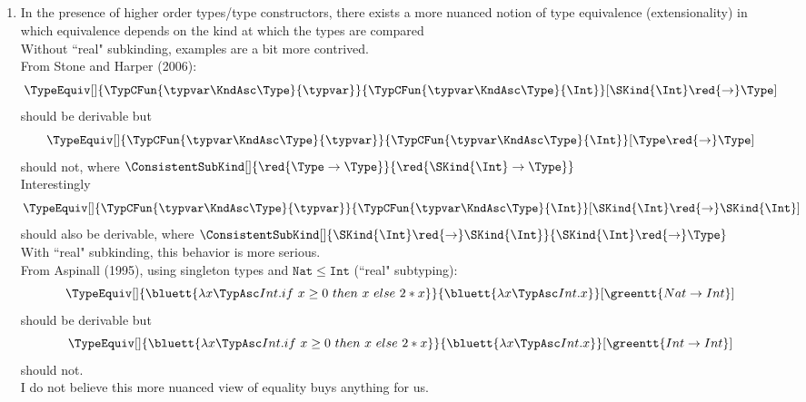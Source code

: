 \documentclass[12pt,fleqn]{article}
\begin{document}
    \subsection*{}
    \begin{enumerate}[label=Nibwm \arabic*:]
        \item In the presence of higher order types/type constructors, there exists a more nuanced notion of type equivalence (extensionality) in which equivalence depends on the kind at which the types are compared \\
            Without ``real" subkinding, examples are a bit more contrived. \\
            From Stone and Harper (2006): \\
            \[
                \TypeEquiv[]{\TypCFun{\typvar\KndAsc\Type}{\typvar}}{\TypCFun{\typvar\KndAsc\Type}{\Int}}[\SKind{\Int} \red{\rightarrow} \Type]
            \]
            should be derivable but
            \[
                \TypeEquiv[]{\TypCFun{\typvar\KndAsc\Type}{\typvar}}{\TypCFun{\typvar\KndAsc\Type}{\Int}}[\Type \red{\rightarrow} \Type]
            \]
            should not, where $\ConsistentSubKind[]{\red{\Type \rightarrow \Type}}{\red{\SKind{\Int} \rightarrow \Type}}$ \\
            Interestingly
            \[
                \TypeEquiv[]{\TypCFun{\typvar\KndAsc\Type}{\typvar}}{\TypCFun{\typvar\KndAsc\Type}{\Int}}[\SKind{\Int} \red{\rightarrow} \SKind{\Int}]
            \]
            should also be derivable, where $\ConsistentSubKind[]{\SKind{\Int} \red{\rightarrow} \SKind{\Int}}{\SKind{\Int} \red{\rightarrow} \Type}$ \\
            With ``real" subkinding, this behavior is more serious. \\
            From Aspinall (1995), using singleton types and $\mathtt{Nat \le Int}$ (``real" subtyping):
            \[
                \TypeEquiv[]{\bluett{\lambda x\TypAsc Int.if~x \ge 0~then~x~else~2*x}}{\bluett{\lambda x\TypAsc Int.x}}[\greentt{Nat \rightarrow Int}]
            \]
            should be derivable but
            \[
                \TypeEquiv[]{\bluett{\lambda x\TypAsc Int.if~x \ge 0~then~x~else~2*x}}{\bluett{\lambda x\TypAsc Int.x}}[\greentt{Int \rightarrow Int}]
            \]
            should not. \\
            I do not believe this more nuanced view of equality buys anything for us.
    \end{enumerate}
\newpage
    
    
\end{document}
